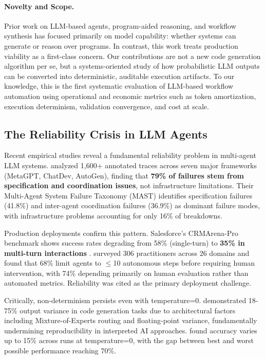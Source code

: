 \documentclass[11pt]{article}
\begin{document}
\paragraph{Novelty and Scope.}
Prior work on LLM-based agents, program-aided reasoning, and workflow synthesis has focused primarily on model capability: whether systems can generate or reason over programs. In contrast, this work treats production viability as a first-class concern. Our contributions are not a new code generation algorithm per se, but a systems-oriented study of how probabilistic LLM outputs can be converted into deterministic, auditable execution artifacts. To our knowledge, this is the first systematic evaluation of LLM-based workflow automation using operational and economic metrics such as token amortization, execution determinism, validation convergence, and cost at scale.

\subsection{The Reliability Crisis in LLM Agents}

Recent empirical studies reveal a fundamental reliability problem in multi-agent LLM systems. \citet{cemri2025multiagent} analyzed 1,600+ annotated traces across seven major frameworks (MetaGPT, ChatDev, AutoGen), finding that \textbf{79\% of failures stem from specification and coordination issues}, not infrastructure limitations. Their Multi-Agent System Failure Taxonomy (MAST) identifies specification failures (41.8\%) and inter-agent coordination failures (36.9\%) as dominant failure modes, with infrastructure problems accounting for only 16\% of breakdowns.

Production deployments confirm this pattern. Salesforce's CRMArena-Pro benchmark shows success rates degrading from 58\% (single-turn) to \textbf{35\% in multi-turn interactions} \citep{salesforce2025agents}. \citet{pan2025measuring} surveyed 306 practitioners across 26 domains and found that 68\% limit agents to $\leq$10 autonomous steps before requiring human intervention, with 74\% depending primarily on human evaluation rather than automated metrics. Reliability was cited as the primary deployment challenge.

Critically, non-determinism persists even with temperature=0. \citet{ouyang2023nondeterminism} demonstrated 18-75\% output variance in code generation tasks due to architectural factors including Mixture-of-Experts routing and floating-point variance, fundamentally undermining reproducibility in interpreted AI approaches. \citet{atil2024nondeterminism} found accuracy varies up to 15\% across runs at temperature=0, with the gap between best and worst possible performance reaching 70\%.
\end{document}

